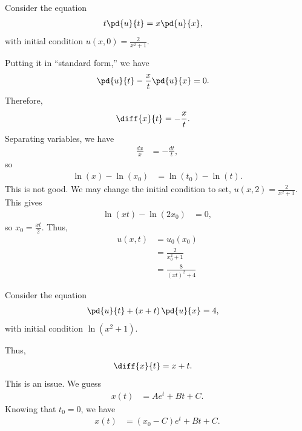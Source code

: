 \documentclass[10pt]{mypackage}
\begin{document}
\begin{example}
  Consider the equation
  \begin{align*}
    t \pd{u}{t} &= x \pd{u}{x},
  \end{align*}
  with initial condition $u\left( x,0 \right) = \frac{2}{x^2 + 1}$.\newline

  Putting it in ``standard form,'' we have
  \begin{align*}
    \pd{u}{t} - \frac{x}{t} \pd{u}{x} &= 0.
  \end{align*}
  Therefore,
  \begin{align*}
    \diff{x}{t} &= -\frac{x}{t}.
  \end{align*}
  Separating variables, we have
  \begin{align*}
    \frac{dx}{x} &= -\frac{dt}{t},
  \end{align*}
  so
  \begin{align*}
    \ln\left( x \right)-\ln\left( x_0 \right) &= \ln\left(t_0  \right) - \ln\left( t \right).
  \end{align*}
  This is not good. We may change the initial condition to set, $u\left( x,2 \right) = \frac{2}{x^2 + 1}$. This gives
  \begin{align*}
    \ln\left( xt \right) - \ln\left( 2x_0 \right) &= 0,
  \end{align*}
  so $x_0 = \frac{xt}{2}$. Thus,
  \begin{align*}
    u\left( x,t \right) &= u_0\left( x_0 \right)\\
                        &= \frac{2}{x_0^2 + 1}\\
                        &= \frac{8}{\left( xt \right)^2 + 4}
  \end{align*}
\end{example}
\begin{example}
  Consider the equation
  \begin{align*}
    \pd{u}{t} + \left( x + t \right)\pd{u}{x} &= 4,
  \end{align*}
  with initial condition $\ln\left( x^2 + 1 \right)$.\newline

  Thus,
  \begin{align*}
    \diff{x}{t} &= x + t.
  \end{align*}
  This is an issue. We guess
  \begin{align*}
    x(t) &= Ae^{t} + Bt + C.
  \end{align*}
  Knowing that $t_0 = 0$, we have
  \begin{align*}
    x(t) &= \left( x_0 - C \right)e^{t} + Bt + C.
  \end{align*}
\end{example}
\end{document}
